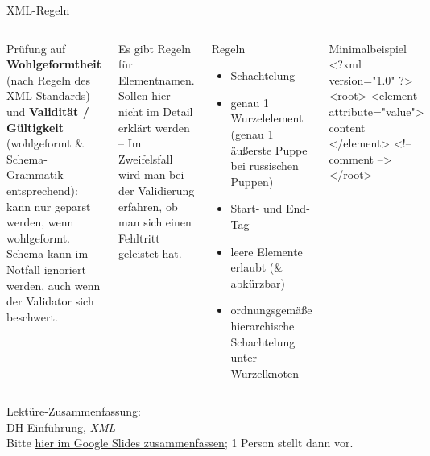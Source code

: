 \begin{frame}[fragile]{XML-Regeln}
\begin{columns}
\footnotesize
Prüfung auf \textbf{Wohlgeformtheit} (nach Regeln des XML-Standards) und \textbf{Validität / Gültigkeit} (wohlgeformt \& Schema-Grammatik entsprechend): kann nur geparst werden, wenn wohlgeformt. Schema kann im Notfall ignoriert werden, auch wenn der Validator sich beschwert.

Es gibt Regeln für Elementnamen. Sollen hier nicht im Detail erklärt werden -- Im Zweifelsfall wird man bei der Validierung erfahren, ob man sich einen Fehltritt geleistet hat.
\bigskip


\footnotesize
{}
\begin{block}{Regeln}
\begin{itemize}
    \item Schachtelung \item genau 1 Wurzelelement (genau 1 äußerste Puppe bei russischen Puppen)
    \item Start- und End-Tag %
    \item leere Elemente erlaubt (\& abkürzbar) \item ordnungsgemäße hierarchische Schachtelung unter Wurzelknoten
\end{itemize}
\end{block}
\bigskip 

\begin{myxml}{Minimalbeispiel}
<?xml version="1.0" ?>
<root>
  <element attribute="value">
    content
  </element>
  <!-- comment -->
</root>
\end{myxml}
\end{columns}

\end{frame}



\begin{frame}[standout]
    \alert{Lektüre}-Zusammenfassung: \\
    DH-Einführung, \emph{XML} \\[1em]
    {\footnotesize Bitte \alert{\href{https://docs.google.com/presentation/d/1JweC-x1MxLjoKcDcHDtsw6NoYZfSbQ0USVYzYxqVx_c/edit?usp=sharing}{hier im Google Slides zusammenfassen}}; 1 Person stellt dann vor. \\
    }
\end{frame}


